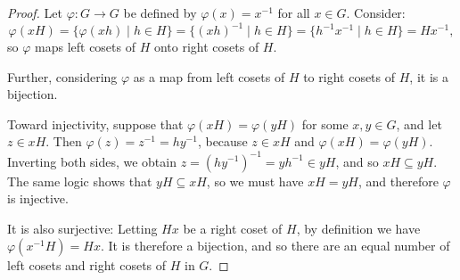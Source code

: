 \documentclass{article}
\begin{document}
\begin{proof}
    Let $\varphi: G \rightarrow G$ be defined by $\varphi(x) = x^{-1}$ for all $x \in G$. Consider:
    \begin{equation*}
        \varphi(xH) = \{ \varphi(xh) \mid h \in H \} = \{ (xh)^{-1} \mid h \in H \} = \{ h^{-1} x^{-1} \mid h \in H \} = Hx^{-1},
    \end{equation*}
    so $\varphi$ maps left cosets of $H$ onto right cosets of $H$.

    Further, considering $\varphi$ as a map from left cosets of $H$ to right cosets of $H$, it is a bijection.
    
    Toward injectivity, suppose that $\varphi(xH) = \varphi(yH)$ for some $x, y \in G$, and let $z \in xH$. Then $\varphi(z) = z^{-1} = hy^{-1}$, because $z \in xH$ and $\varphi(xH) = \varphi(yH)$. Inverting both sides, we obtain $z = (hy^{-1})^{-1} = yh^{-1} \in yH$, and so $xH \subseteq yH$. The same logic shows that $yH \subseteq xH$, so we must have $xH = yH$, and therefore $\varphi$ is injective.

    It is also surjective: Letting $Hx$ be a right coset of $H$, by definition we have $\varphi(x^{-1}H) = Hx$. It is therefore a bijection, and so there are an equal number of left cosets and right cosets of $H$ in $G$. 
\end{proof}
\end{document}
